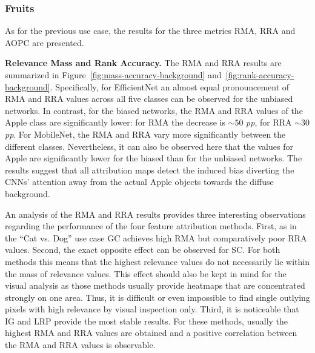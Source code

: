 \documentclass[runningheads]{llncs}
\newcommand{\Fig}[1]{Figure~\ref{#1}}
\begin{document}
\subsubsection{Fruits}
\vspace{-2mm}
As for the previous use case, the results for the three metrics RMA, RRA and AOPC are presented.

\textbf{Relevance Mass and Rank Accuracy.}
The RMA and RRA results are summarized in \Fig{fig:mass-accuracy-background} and~\ref{fig:rank-accuracy-background}. Specifically, for EfficientNet an almost equal pronouncement of RMA and RRA values across all five classes can be observed for the unbiased networks. In contrast, for the biased networks, the RMA and RRA values of the Apple class are significantly lower: for RMA the decrease is $\sim50$ \emph{pp}, for RRA $\sim30$ \emph{pp}. For MobileNet, the RMA and RRA vary more significantly between the different classes. Nevertheless, it can also be observed here that the values for Apple are significantly lower for the biased than for the unbiased networks. The results suggest that all attribution maps detect the induced bias diverting the CNNs' attention away from the actual Apple objects towards the diffuse background.

An analysis of the RMA and RRA results provides three interesting observations regarding the performance of the four feature attribution methods. First, as in the \enquote{Cat vs. Dog} use case GC achieves high RMA but comparatively poor RRA values. Second, the exact opposite effect can be observed for SC. For both methods this means that the highest relevance values do not necessarily lie within the mass of relevance values. This effect should also be kept in mind for the visual analysis as those methods usually provide heatmaps that are concentrated strongly on one area. Thus, it is difficult or even impossible to find single outlying pixels with high relevance by visual inspection only. Third, it is noticeable that IG and LRP provide the most stable results. For these methods, usually the highest RMA and RRA values are obtained and a positive correlation between the RMA and RRA values is observable.
\end{document}
